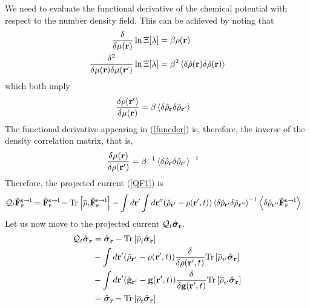 \documentclass[b5paper,openright,10pt]{book}
\newcommand{\llangle}{\left\langle}
\newcommand{\rrangle}{\right\rangle}
\begin{document}
\begin{appendices}
We need to evaluate the functional derivative of the chemical potential with respect to the number density field. This can be achieved by noting that 
\begin{align}
  \frac{\delta}{\delta \mu({\bf r})}\ln \Xi[\lambda]&=\beta\rho({\bf r})
\nonumber\\
  \frac{\delta^2}{\delta \mu({\bf r})\delta \mu({\bf r}')}\ln \Xi[\lambda]&=
\beta^2\llangle \delta\hat{\rho}({\bf r})\delta\hat{\rho}({\bf r})\rrangle
\label{chi1}
\end{align}
which both imply
\begin{align}
  \frac{\delta \rho({\bf r}')  }{\delta \mu({\bf r})}&=\beta
\llangle \delta\hat{\rho}_{{\bf r}}\delta\hat{\rho}_{{\bf r}'}\rrangle
\label{chi2}
\end{align}
The functional derivative appearing in (\ref{funcder}) is, therefore, the inverse of the
density correlation matrix, that is,
\begin{align}
  \frac{\delta \mu({\bf r})}{\delta \rho({\bf r}')  }&=\beta^{-1}
\llangle \delta\hat{\rho}_{{\bf r}}\delta\hat{\rho}_{{\bf r}'}\rrangle^{-1}
\label{chi3}
\end{align}
Therefore, the projected current (\ref{QF1}) is
\begin{align}
  {\cal Q}_t\hat{\bf F}^{\rm s\to l}_{{\bf r}}&=
\hat{\bf F}^{\rm s\to l}_{{\bf r}}- {\rm Tr}\left[\overline{\rho}_{t} \hat{\bf F}^{\rm s\to l}_{{\bf r}}\right]
-\int d{\bf r}'\int d{\bf r}''(\hat{\rho}_{{\bf r}'}-{\rho}({\bf r}',t))
\llangle \delta\hat{\rho}_{{\bf r}'}\delta\hat{\rho}_{{\bf r}''}\rrangle^{-1}
\llangle \delta \hat{\rho}_{{\bf r}''}\hat{\bf F}^{\rm s\to l}_{{\bf r}}\rrangle\label{QF1b}
\end{align}
Let us now move to the projected current ${\cal Q}_t\hat{\boldsymbol{\sigma}}_{\bf r}$. 
\begin{align}
  {\cal Q}_t\hat{\boldsymbol{\sigma}}_{{\bf r}}&=
\hat{\boldsymbol{\sigma}}_{{\bf r}}- {\rm Tr}\left[\overline{\rho}_{t} \hat{\boldsymbol{\sigma}}_{{\bf r}}\right]
\nonumber\\
&-\int d{\bf r}'(\hat{\rho}_{{\bf r}'}-\rho({\bf r}',t))
\frac{\delta}{\delta \rho({\bf r}',t)}{\rm Tr}\left[\overline{\rho}_{t'}\hat{\boldsymbol{\sigma}}_{{\bf r}}\right]
\nonumber\\
&-\int d{\bf r}'(\hat{\bf g}_{{\bf r}'}-{\bf g}({\bf r}',t))
\frac{\delta}{\delta {\bf g}({\bf r}',t)}{\rm Tr}\left[\overline{\rho}_{t'}  \hat{\boldsymbol{\sigma}}_{{\bf r}}\right]
\nonumber\\
&=\hat{\boldsymbol{\sigma}}_{{\bf r}}- {\rm Tr}\left[\overline{\rho}_{t} \hat{\boldsymbol{\sigma}}_{{\bf r}}\right]

\end{align}
\end{appendices}
\end{document}
